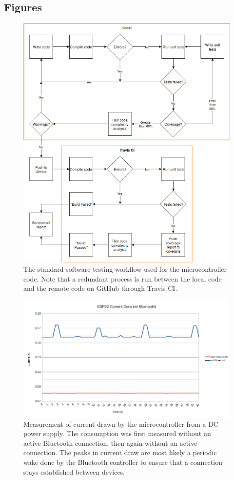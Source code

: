 \documentclass[12pt]{article}
\begin{document}
\subsection{Figures}
\begin{figure}[H]
    \centering
    \includegraphics[scale=0.5]{images/workflow}
    \caption{The standard software testing workflow used for the microcontroller code. Note that a redundant process is run between the local code and the remote code on GitHub  through Travis CI.}
    \label{fig:workflow}
\end{figure}

\begin{figure}[H]
    \centering
    \includegraphics[scale=0.5]{images/powerdata}
    \caption{Measurement of current drawn by the microcontroller from a DC power supply. The consumption was first measured without an active Bluetooth connection, then again without an active connection. The peaks in current draw are most likely a periodic wake done by the Bluetooth controller to ensure that a connection stays established between devices.}
    \label{fig:powerdata}
\end{figure}
\end{document}
